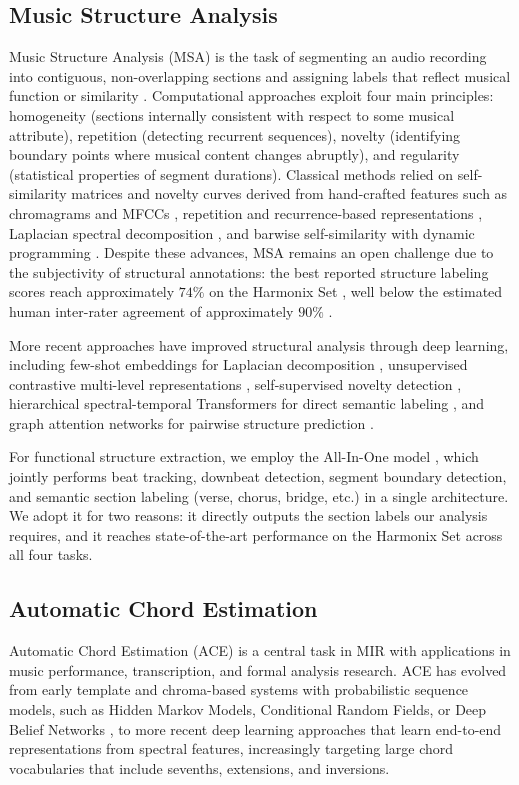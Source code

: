 \documentclass{article}
\begin{document}
\subsection{Music Structure Analysis}
\label{sec:msa}
Music Structure Analysis (MSA) is the task of segmenting an audio recording into contiguous, non-overlapping sections and assigning labels that reflect musical function or similarity \citep{nieto2020audio}. Computational approaches exploit four main principles: homogeneity (sections internally consistent with respect to some musical attribute), repetition (detecting recurrent sequences), novelty (identifying boundary points where musical content changes abruptly), and regularity (statistical properties of segment durations). Classical methods relied on self-similarity matrices and novelty curves derived from hand-crafted features such as chromagrams and MFCCs \citep{foote2000automatic}, repetition and recurrence-based representations \citep{levy2008structural, serra2012unsupervised}, Laplacian spectral decomposition \citep{mcfee2014learning}, and barwise self-similarity with dynamic programming \citep{Marmoret_2023}. Despite these advances, MSA remains an open challenge due to the subjectivity of structural annotations: the best reported structure labeling scores reach approximately $74\%$ on the Harmonix Set \citep{taejun2023allinone}, well below the estimated human inter-rater agreement of approximately $90\%$ \citep{nieto2020audio}.

More recent approaches have improved structural analysis through deep learning, including few-shot embeddings for Laplacian decomposition \citep{salamon2021deep}, unsupervised contrastive multi-level representations \citep{buisson2022learning}, self-supervised novelty detection \citep{peeters2023self}, hierarchical spectral-temporal Transformers for direct semantic labeling \citep{wang2022catch}, and graph attention networks for pairwise structure prediction \citep{buisson2024using}.

For functional structure extraction, we employ the All-In-One model \citep{taejun2023allinone}, which jointly performs beat tracking, downbeat detection, segment boundary detection, and semantic section labeling (verse, chorus, bridge, etc.) in a single architecture. We adopt it for two reasons: it directly outputs the section labels our analysis requires, and it reaches state-of-the-art performance on the Harmonix Set across all four tasks.

\subsection{Automatic Chord Estimation}
\label{sec:ace}
Automatic Chord Estimation (ACE) is a central task in MIR with applications in music performance, transcription, and formal analysis research. ACE has evolved from early template and chroma-based systems with probabilistic sequence models, such as Hidden Markov Models, Conditional Random Fields, or Deep Belief Networks \citep{mauch2009simultaneous, ni2012end, humphrey2015four}, to more recent deep learning approaches that learn end-to-end representations from spectral features, increasingly targeting large chord vocabularies that include sevenths, extensions, and inversions.
\end{document}
